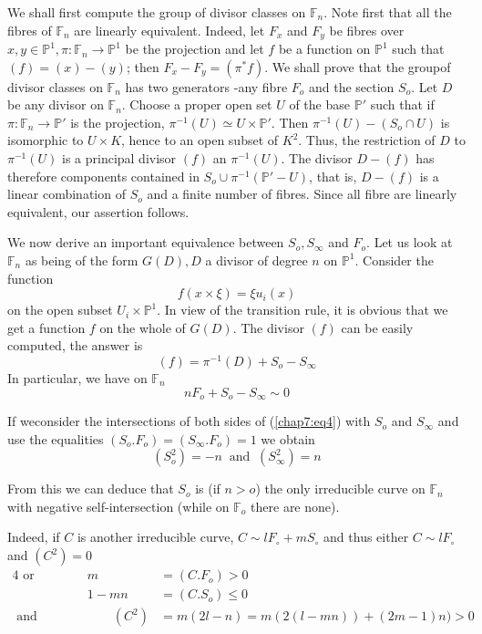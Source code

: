 We shall first compute the group of divisor classes on
$\mathbb{F}_n$. Note first that all the fibres of $\mathbb{F}_n$ are
linearly equivalent. Indeed, let $F_x$ and $F_y$  be fibres over $x,y
\in \mathbb{P}^1, \pi :\mathbb{F}_n \to \mathbb{P}^1$ be the
projection and let $f$ be a function on $\mathbb{P}^1$ such that
$(f)=(x)-(y)$; then $F_x-F_y=(\pi ^* f)$. We shall prove that the
group\pageoriginale of divisor classes on $\mathbb{F}_n$ has two
generators -any fibre 
$F_o$ and the section $S_o$. Let $D$ be any divisor on
$\mathbb{F}_n$. Choose a proper open set $U$ of the base $\mathbb{P'}$
such that if $\pi :\mathbb{F}_n \to \mathbb{P'}$ is the projection,
$\pi^{-1} (U)\simeq U\times \mathbb{P'}$. Then $\pi ^{-1}(U)-(S_o\cap
U)$ is isomorphic to $U \times K$, hence to an open subset of
$K^2$. Thus, the restriction of $D$ to $\pi ^{-1}(U)$ is a principal
divisor $(f)$ an $\pi ^{-1}(U)$. The divisor $D-(f)$ has therefore
components contained in $S_o \cup \pi^{-1}(\mathbb{P'}-U)$, that is,
$D-(f)$ is a linear combination of $S_o$ and a finite number of
fibres. Since all fibre are linearly equivalent, our assertion
follows. 

We now derive an important equivalence between $S_o,S_ \infty$ and
$F_o$. Let us look at $\mathbb{F}_n$ as being of the form $G(D), D$ a
divisor of degree $n$ on $\mathbb{P}^1$. Consider the function  
$$
f(x \times \xi)=\xi u_i (x)
$$   
on the open subset $U_i \times \mathbb{P}^1$. In view of the
transition rule, it is obvious that we get a function $f$ on the
whole of $G(D)$. The divisor $(f)$ can be easily computed, the answer
is  
$$
 (f)=\pi^{-1}(D)+S_o-S_\infty
$$   
In particular, we have on $\mathbb{F}_n$
\begin{equation*}
  n F_o + S_o-S_ \infty \sim 0 \tag{4}\label{chap7:eq4}
\end{equation*} 
 
 If we\pageoriginale consider the intersections of both sides of
 (\ref{chap7:eq4}) with $S_o$  and $S_ \infty$ and use the equalities
 $(S_o.F_o)=(S_ \infty. F_o)=1$  we obtain  
 $$
 (S^2_o)=-n~ \text { and }~(S^2_ \infty)=n
 $$
 
 From this we can deduce that $S_o$ is (if $n>o$) the only
 irreducible curve on $\mathbb{F}_n$ with negative self-intersection
 (while on $\mathbb{F}_o$ there are none). 
 
 Indeed, if $C$ is another irreducible curve, $C \sim  lF_\circ +mS_\circ$ and
 thus either $C \sim lF_\circ$ and $(C^2)=0$  
 \begin{alignat*}{4}
   \text { or } & \qquad & m &=(C.F_o)>0\\
   &&1-mn &=(C.S_o)\le 0\\
   \text { and }&& \qquad (C^2) & =
   m(2l-n) = m(2(l-mn)) + (2m-1)n) > 0\qquad 
 \end{alignat*} 
 
